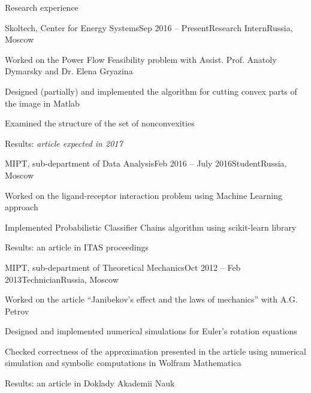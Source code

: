 \documentclass{resume} %
\begin{document}
\begin{rSection}{Research experience}
	\begin{rSubsection}{Skoltech, Center for Energy Systems}{Sep 2016 -- Present}{Research Intern}{Russia, Moscow}
		\item Worked on the Power Flow Feasibility problem with Assist. Prof. Anatoly Dymarsky and Dr. Elena Gryazina
		\item Designed (partially) and implemented the algorithm for cutting convex parts of the image in Matlab
		\item Examined the structure of the set of nonconvexities
		\item Results: \em article expected in 2017
	\end{rSubsection}
	
	\begin{rSubsection}{MIPT, sub-department of Data Analysis}{Feb 2016 -- July 2016}{Student}{Russia, Moscow}
		\item Worked on the ligand-receptor interaction problem using Machine Learning approach
		\item Implemented Probabilistic Classifier Chains algorithm using scikit-learn library
		\item Results: an article in ITAS proceedings
	\end{rSubsection}
	
	\begin{rSubsection}{MIPT, sub-department of Theoretical Mechanics}{Oct 2012 -- Feb 2013}{Technician}{Russia, Moscow}
		\item Worked on the article ``Janibekov's effect and the laws of mechanics'' with A.G. Petrov
		\item Designed and implemented numerical simulations for Euler's rotation equations
		\item Checked correctness of the approximation presented in the article using numerical simulation and symbolic computations in Wolfram Mathematica
		\item Results: an article in Doklady Akademii Nauk
	\end{rSubsection}
\end{rSection}

\end{document}

